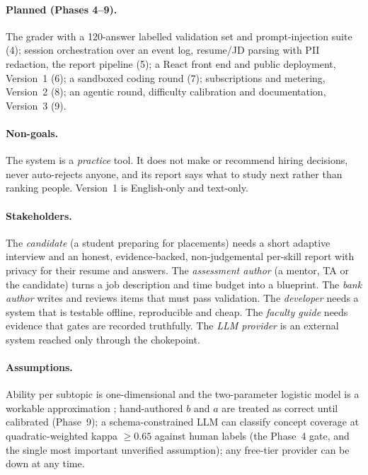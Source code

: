 \documentclass{tietreport}
\begin{document}
\paragraph{Planned (Phases 4--9).} The grader with a 120-answer labelled validation set and
prompt-injection suite (4); session orchestration over an event log, resume/JD parsing with PII
redaction, the report pipeline (5); a React front end and public deployment, Version~1 (6); a
sandboxed coding round (7); subscriptions and metering, Version~2 (8); an agentic round,
difficulty calibration and documentation, Version~3 (9).

\paragraph{Non-goals.} The system is a \emph{practice} tool. It does not make or recommend
hiring decisions, never auto-rejects anyone, and its report says what to study next rather than
ranking people. Version~1 is English-only and text-only.

\paragraph{Stakeholders.} The \emph{candidate} (a student preparing for placements) needs a
short adaptive interview and an honest, evidence-backed, non-judgemental per-skill report with
privacy for their resume and answers. The \emph{assessment author} (a mentor, TA or the
candidate) turns a job description and time budget into a blueprint. The \emph{bank author}
writes and reviews items that must pass validation. The \emph{developer} needs a system that is
testable offline, reproducible and cheap. The \emph{faculty guide} needs evidence that gates are
recorded truthfully. The \emph{LLM provider} is an external system reached only through the
chokepoint.

\paragraph{Assumptions.} Ability per subtopic is one-dimensional and the two-parameter
logistic model is a workable approximation \cite{vanderlinden2000cat}; hand-authored $b$ and $a$
are treated as correct until calibrated (Phase~9); a schema-constrained LLM can classify concept
coverage at quadratic-weighted kappa $\geq 0.65$ against human labels (the Phase~4 gate, and the
single most important unverified assumption); any free-tier provider can be down at any time.
\end{document}
